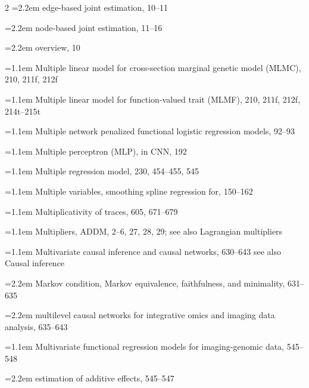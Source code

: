 \begin{multicols}{2}
\noindent\hangindent=2.2em \hspace*{1.1em}edge-based joint estimation, 10--11\par
\noindent\hangindent=2.2em \hspace*{1.1em}node-based joint estimation, 11--16\par
\noindent\hangindent=2.2em \hspace*{1.1em}overview, 10\par
\noindent\hangindent=1.1em Multiple linear model for cross-section marginal genetic model (MLMC), 210, 211f, 212f\par
\noindent\hangindent=1.1em Multiple linear model for function-valued trait (MLMF), 210, 211f, 212f, 214t--215t\par
\noindent\hangindent=1.1em Multiple network penalized functional logistic regression models, 92--93\par
\noindent\hangindent=1.1em Multiple perceptron (MLP), in CNN, 192\par
\noindent\hangindent=1.1em Multiple regression model, 230, 454--455, 545\par
\noindent\hangindent=1.1em Multiple variables, smoothing spline regression for, 150--162\par
\noindent\hangindent=1.1em Multiplicativity of traces, 605, 671--679\par
\noindent\hangindent=1.1em Multipliers, ADDM, 2--6, 27, 28, 29; see also Lagrangian multipliers\par
\noindent\hangindent=1.1em Multivariate causal inference and causal networks, 630--643 see also Causal inference\par
\noindent\hangindent=2.2em \hspace*{1.1em}Markov condition, Markov equivalence, faithfulness, and minimality, 631--635\par
\noindent\hangindent=2.2em \hspace*{1.1em}multilevel causal networks for integrative omics and imaging data analysis, 635--643\par
\noindent\hangindent=1.1em Multivariate functional regression models for imaging-genomic data, 545--548\par
\noindent\hangindent=2.2em \hspace*{1.1em}estimation of additive effects, 545--547\par

\end{multicols}
